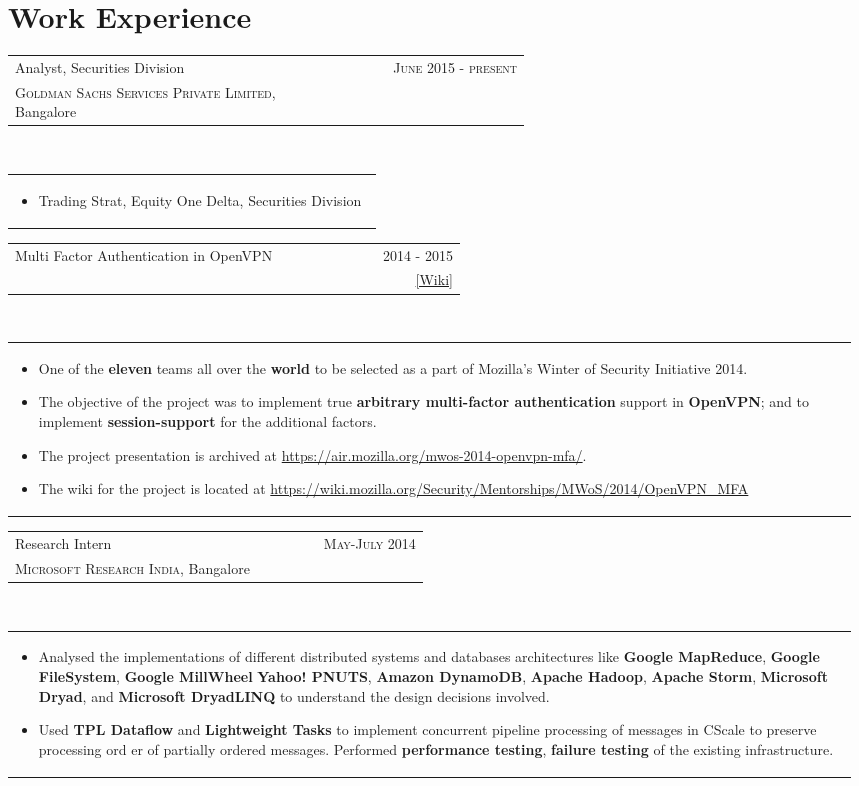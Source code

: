 \documentclass[a4paper]{article} %
\newcommand{\verticalspacing}{-0.25cm}
\newcommand{\bulletspace}{0.7cm}
\newcommand{\projectheadspacing}{6.9cm}
\newcommand{\cproject}[5]{%
    \begin{tabular}{p{0.60\linewidth}r}
        \textcolor{NavyBlue}{\small #2} & \multicolumn{1}{m{ \projectheadspacing{} }}{\raggedleft \small {\textsc{#1}}}\\
        \small {#3} & \small {#4}
    \end{tabular}\\
    \begin{tabular}{p{0.98\linewidth}}
    \vspace{-0.3cm}
        \small{#5}
    \end{tabular}
    \vspace{\verticalspacing{}}
}
\begin{document}
\section{Work Experience}
\cproject
      {June 2015 - present}
      {Analyst, Securities Division}
      {\textsc{Goldman Sachs Services Private Limited}, Bangalore}
      {}
      {%
        \begin{itemize}[leftmargin=\bulletspace{}]
          \item Trading Strat, Equity One Delta, Securities Division
        \end{itemize}
      }

\cproject
    {2014 - 2015}
    {Multi Factor Authentication in OpenVPN}
    {\textsc{\raggedright Mozilla Winter of Security}, Guillaume Destuynder, Professor Dheeraj Sanghi}
    {\href{https://wiki.mozilla.org/Security/Mentorships/MWoS/2014/OpenVPN\_MFA} {[Wiki]} }
    {%
        \begin{itemize}[leftmargin=\bulletspace{}]
          \item One of the \textbf{eleven} teams all over the \textbf{world} to be selected as a part of Mozilla's Winter of Security Initiative 2014.
          \item The objective of the project was to implement true \textbf{arbitrary multi-factor authentication} support in
              \textbf{OpenVPN}; and to implement \textbf{session-support} for the additional factors.
          \item The project presentation is archived at
              \href{https://air.mozilla.org/mwos-2014-openvpn-mfa/}{https://air.mozilla.org/mwos-2014-openvpn-mfa/}.
          \item The wiki for the project is located at \href{https://wiki.mozilla.org/Security/Mentorships/MWoS/2014/OpenVPN\_MFA} {https://wiki.mozilla.org/Security/Mentorships/MWoS/2014/OpenVPN\_MFA}
      \end{itemize}
    }


\cproject
      {May-July 2014}
      {Research Intern}
      {\textsc{Microsoft Research India}, Bangalore}
      {}
      {%
          \begin{itemize}[leftmargin=\bulletspace{}]
              \item Analysed the implementations of different distributed systems and databases architectures like
                  \textbf{Google MapReduce}, \textbf{Google FileSystem}, \textbf{Google MillWheel} \textbf{Yahoo! PNUTS},
                  \textbf{Amazon DynamoDB}, \textbf{Apache Hadoop}, \textbf{Apache Storm}, \textbf{Microsoft Dryad},
                  and \textbf{Microsoft DryadLINQ} to understand the design decisions involved.
              \item Used \textbf{TPL Dataflow} and \textbf{Lightweight Tasks} to implement concurrent pipeline
                  processing of messages in CScale to preserve processing ord
                  er of partially ordered messages.
                  Performed \textbf{performance testing}, \textbf{failure testing} of the existing infrastructure.
          \end{itemize}
     }
\end{document}

